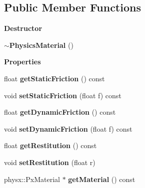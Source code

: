 \subsection*{Public Member Functions}
\begin{Indent}\textbf{ Destructor}\par
\begin{DoxyCompactItemize}
\item 
\mbox{\label{classrev_1_1_physics_material_af7b87dab5a1bfc3de504fd00e4f9217d}} 
{\bfseries $\sim$\+Physics\+Material} ()
\end{DoxyCompactItemize}
\end{Indent}
\begin{Indent}\textbf{ Properties}\par
\begin{DoxyCompactItemize}
\item 
\mbox{\label{classrev_1_1_physics_material_ab2d5f56844587f38e24a210908fe353c}} 
float {\bfseries get\+Static\+Friction} () const
\item 
\mbox{\label{classrev_1_1_physics_material_a88eca566f9bc3b25091e78f8326fc82d}} 
void {\bfseries set\+Static\+Friction} (float f) const
\item 
\mbox{\label{classrev_1_1_physics_material_af5731a9b7ff7671bb1d61c22d8cfb362}} 
float {\bfseries get\+Dynamic\+Friction} () const
\item 
\mbox{\label{classrev_1_1_physics_material_ac7a6251f117d8a03373f2afcd7fd9b39}} 
void {\bfseries set\+Dynamic\+Friction} (float f) const
\item 
\mbox{\label{classrev_1_1_physics_material_a22586c89e8340b32570853768f8c0b7d}} 
float {\bfseries get\+Restitution} () const
\item 
\mbox{\label{classrev_1_1_physics_material_a46eda01ed172b69cc55de9fadd9fe08b}} 
void {\bfseries set\+Restitution} (float r)
\item 
\mbox{\label{classrev_1_1_physics_material_a734b0bfd2b275299ca8623f51c91a696}} 
physx\+::\+Px\+Material $\ast$ {\bfseries get\+Material} () const
\end{DoxyCompactItemize}
\end{Indent}
